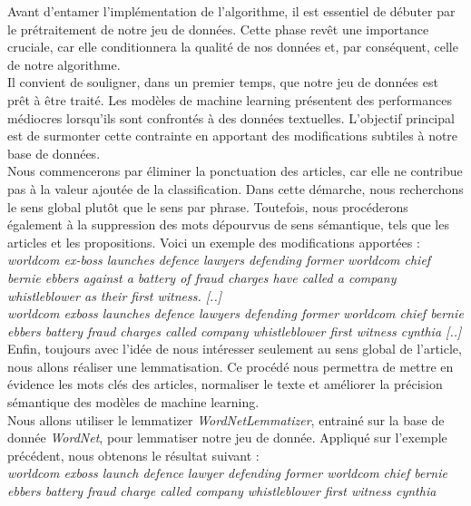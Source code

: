 \documentclass[a4paper,12pt]{article}
\begin{document}
Avant d'entamer l'implémentation de l'algorithme, il est essentiel de débuter par le prétraitement de notre jeu de données. Cette phase revêt une importance cruciale, car elle conditionnera la qualité de nos données et, par conséquent, celle de notre algorithme.\\

Il convient de souligner, dans un premier temps, que notre jeu de données est prêt à être traité. Les modèles de machine learning présentent des performances médiocres lorsqu'ils sont confrontés à des données textuelles. L'objectif principal est de surmonter cette contrainte en apportant des modifications subtiles à notre base de données.\\

Nous commencerons par éliminer la ponctuation des articles, car elle ne contribue pas à la valeur ajoutée de la classification. Dans cette démarche, nous recherchons le sens global plutôt que le sens par phrase. Toutefois, nous procéderons également à la suppression des mots dépourvus de sens sémantique, tels que les articles et les propositions. Voici un exemple des modifications apportées :\\

\textit{worldcom ex-boss launches defence lawyers defending former worldcom chief bernie ebbers against a battery of fraud charges have called a company whistleblower as their first witness. [..]}\\
\textit{worldcom exboss launches defence lawyers defending former worldcom chief bernie ebbers battery fraud charges called company whistleblower first witness cynthia [..]}\\

Enfin, toujours avec l'idée de nous intéresser seulement au sens global de l'article, nous allons réaliser une lemmatisation. Ce procédé nous permettra de mettre en évidence les mots clés des articles, normaliser le texte et améliorer la précision sémantique des modèles de machine learning.\\
Nous allons utiliser le lemmatizer \textit{WordNetLemmatizer}, entrainé sur la base de donnée \textit{WordNet}, pour lemmatiser notre jeu de donnée. Appliqué sur l'exemple précédent, nous obtenons le résultat suivant : \\

\textit{worldcom exboss launch defence lawyer defending former worldcom chief bernie ebbers battery fraud charge called company whistleblower first witness cynthia}
\end{document}
